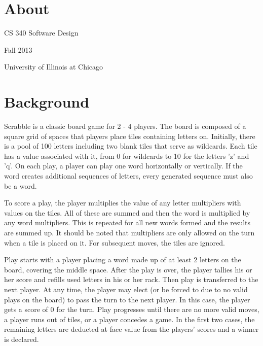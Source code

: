 \hypertarget{index_About}{}\section{About}\label{index_About}
\begin{DoxyParagraph}{C\-S 340 Software Design}

\end{DoxyParagraph}
\begin{DoxyParagraph}{Fall 2013}

\end{DoxyParagraph}
\begin{DoxyParagraph}{University of Illinois at Chicago}

\end{DoxyParagraph}
\hypertarget{index_Background}{}\section{Background}\label{index_Background}
\begin{DoxyParagraph}{Scrabble is a classic board game for 2 -\/ 4 players. The board is composed of a square grid of spaces that players place tiles containing letters on. Initially, there is a pool of 100 letters including two blank tiles that serve as wildcards. Each tile has a value associated with it, from 0 for wildcards to 10 for the letters 'z' and 'q'. On each play, a player can play one word horizontally or vertically. If the word creates additional sequences of letters, every generated sequence must also be a word.}

\end{DoxyParagraph}
\begin{DoxyParagraph}{To score a play, the player multiplies the value of any letter multipliers with values on the tiles. All of these are summed and then the word is multiplied by any word multipliers. This is repeated for all new words formed and the results are summed up. It should be noted that multipliers are only allowed on the turn when a tile is placed on it. For subsequent moves, the tiles are ignored.}

\end{DoxyParagraph}
\begin{DoxyParagraph}{Play starts with a player placing a word made up of at least 2 letters on the board, covering the middle space. After the play is over, the player tallies his or her score and refills used letters in his or her rack. Then play is transferred to the next player. At any time, the player may elect (or be forced to due to no valid plays on the board) to pass the turn to the next player. In this case, the player gets a score of 0 for the turn. Play progresses until there are no more valid moves, a player runs out of tiles, or a player concedes a game. In the first two cases, the remaining letters are deducted at face value from the players' scores and a winner is declared.}

\end{DoxyParagraph}
